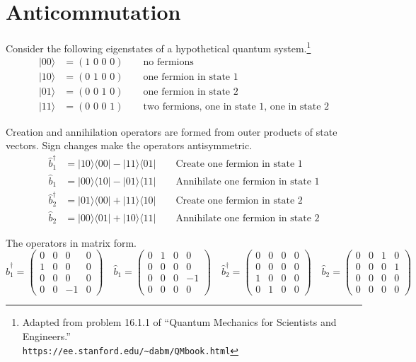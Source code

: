 \documentclass[12pt]{article}
\begin{document}
\section{Anticommutation}
Consider the following eigenstates of a hypothetical quantum system.\footnote{
Adapted from problem 16.1.1 of ``Quantum Mechanics for Scientists and Engineers.''\\
{\tt https://ee.stanford.edu/{\textasciitilde}dabm/QMbook.html}}
\begin{align*}
|00\rangle&=(\text{1 0 0 0})\qquad\text{no fermions}\\
|10\rangle&=(\text{0 1 0 0})\qquad\text{one fermion in state 1}\\
|01\rangle&=(\text{0 0 1 0})\qquad\text{one fermion in state 2}\\
|11\rangle&=(\text{0 0 0 1})\qquad\text{two fermions, one in state 1, one in state 2}
\end{align*}

\noindent
Creation and annihilation operators are formed from outer products of state vectors.
Sign changes make the operators antisymmetric.
\begin{align*}
\hat{b}_1^\dag&=|10\rangle\langle00|-|11\rangle\langle01| \qquad\text{Create one fermion in state 1}
\\
\hat{b}_1&=|00\rangle\langle10|-|01\rangle\langle11| \qquad\text{Annihilate one fermion in state 1}
\\
\hat{b}_2^\dag&=|01\rangle\langle00|+|11\rangle\langle10| \qquad\text{Create one fermion in state 2}
\\
\hat{b}_2&=|00\rangle\langle01|+|10\rangle\langle11| \qquad\text{Annihilate one fermion in state 2}
\end{align*}

\noindent
The operators in matrix form.
\begin{equation*}
\hat{b}_1^\dag=\begin{pmatrix}0&0&0&0\\1&0&0&0\\0&0&0&0\\0&0&-1&0\end{pmatrix}
\quad
\hat{b}_1=\begin{pmatrix}0&1&0&0\\0&0&0&0\\0&0&0&-1\\0&0&0&0\end{pmatrix}
\quad
\hat{b}_2^\dag=\begin{pmatrix}0&0&0&0\\0&0&0&0\\1&0&0&0\\0&1&0&0\end{pmatrix}
\quad
\hat{b}_2=\begin{pmatrix}0&0&1&0\\0&0&0&1\\0&0&0&0\\0&0&0&0\end{pmatrix}
\end{equation*}
\end{document}
